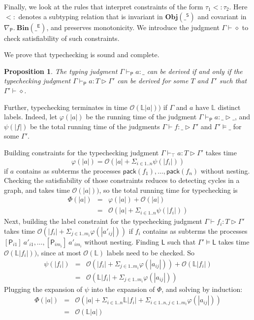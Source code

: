 \documentclass{sigplanconf}
\newcommand{\lab}{\mathsf L}
\newcommand{\labp}{\mathsf P}
\newcommand{\labb}{\mathsf S}
\newcommand{\labt}{\mathsf E}
\newtheorem{proposition}[definition]{Proposition}
\begin{document}
Finally, we look at the rules that interpret constraints of the form $\tau_1 <: \tau_2$. Here $<:$ denotes a subtyping relation that is invariant in $\mathbf{Obj}(\_^{\labb})$ and covariant in $\nabla_{\labp}.~\mathbf{Bin}(\_^{\labt})$, and preserves monotonicity. We introduce the judgment $\Gamma \vdash \diamond$ to check satisfiability of such constraints.

We prove that typechecking is sound and complete.
\begin{proposition}
The typing judgment $\Gamma \vdash_{\labp} a : \_$ can be derived if and only if the typechecking judgment $\Gamma \vdash_{\labp} a : T \rhd \Gamma'$ can be derived for some $T$ and $\Gamma'$ such that $\Gamma' \vdash \diamond$.  
\end{proposition}
\noindent
Further, typechecking terminates in time $\mathcal O(\mathbb L |a|))$ if $\Gamma$ and $a$ have $\mathbb L$ distinct labels. Indeed, let $\varphi(|a|)$ be the running time of the judgment $\Gamma \vdash_{\labp} a : \_ \rhd \_$, and $\psi(|f|)$ be the total running time of the judgments $\Gamma \vdash f : \_ \rhd \Gamma'$ and $\Gamma' \models \_$ for some $\Gamma'$. 

Building constraints for the typechecking judgment $\Gamma \vdash_\top a : T \rhd \Gamma'$ takes time 
$$\varphi(|a|) = \mathcal O(|a| + \Sigma_{i \in 1..n}\psi(|f_i|))$$ if $a$ contains as subterms the  processes $\mathsf{pack}(f_1),\dots,\mathsf{pack}(f_n)$ without nesting. Checking the satisfiability of those constraints reduces to detecting cycles in a graph, and takes time $\mathcal O(|a|))$, so the total running time for typechecking is 
\begin{eqnarray*}
\Phi(|a|) & = & \varphi(|a|) + \mathcal O(|a|) \\
& = &\mathcal O(|a| + \Sigma_{i \in 1..n}\psi(|f_i|))
\end{eqnarray*}
Next, building the label constraint for the typechecking judgment $\Gamma \vdash f_i : T \rhd \Gamma'$ takes time $\mathcal O(|f_i| + \Sigma_{j \in 1..m_i}\varphi(|a'_{ij}|))$ if $f_i$ contains as subterms the processes $[{\labp}_{i1}]~a'_{i1},\dots,[{\labp}_{im_i}]~a'_{im_i}$ without nesting. Finding $\lab$ such that $\Gamma' \models \lab$ takes time $\mathcal O(\mathbb L|f_i|))$, since at most $\mathcal O(\mathbb L)$ labels need to be checked. So 
\begin{eqnarray*}
\psi(|f_i|) & = & \mathcal O(|f_i| + \Sigma_{j \in 1..m_i}\varphi(|a_{ij}|)) + \mathcal O(\mathbb L|f_i|) \\
& = &\mathcal O(\mathbb L|f_i| + \Sigma_{j \in 1..m_i}\varphi(|a_{ij}|))
\end{eqnarray*}
Plugging the expansion of $\psi$ into the expansion of $\Phi$, and solving by induction: 
\begin{eqnarray*}
\Phi(|a|) \!\!\!& = \!&\! \mathcal O(|a| + \Sigma_{i \in 1..n}\mathbb L|f_i| + \Sigma_{i \in 1..n,j \in 1..m_i}\varphi(|a_{ij}|)) \\
\!\!\!& = \!&\! \mathcal O(\mathbb L|a|)
\end{eqnarray*}
\end{document}
